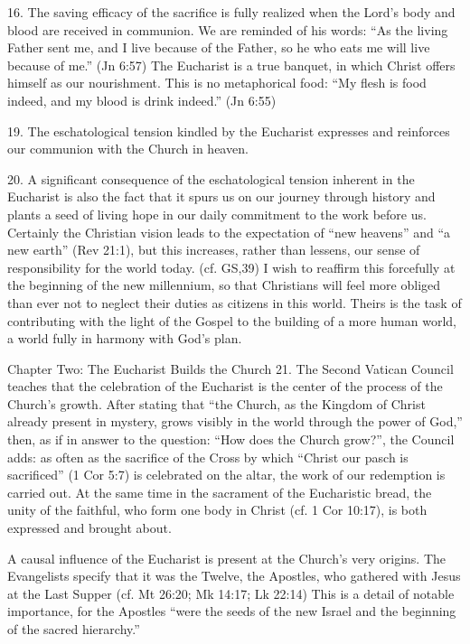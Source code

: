 \documentclass[oneside]{book}
\begin{document}
16. The saving efficacy of the sacrifice is fully realized when the Lord's body
and blood are received in communion. We are reminded of his words: ``As the
living Father sent me, and I live because of the Father, so he who eats me will
live because of me.'' (Jn 6:57) The Eucharist is a true banquet, in which Christ
offers himself as our nourishment. This is no metaphorical food: ``My flesh is
food indeed, and my blood is drink indeed.'' (Jn 6:55)

19. The eschatological tension kindled by the Eucharist expresses and reinforces
our communion with the Church in heaven.

20. A significant consequence of the eschatological tension inherent in the
Eucharist is also the fact that it spurs us on our journey through history and
plants a seed of living hope in our daily commitment to the work before
us. Certainly the Christian vision leads to the expectation of ``new heavens''
and ``a new earth'' (Rev 21:1), but this increases, rather than lessens, our
sense of responsibility for the world today. (cf. GS,39)  I wish to reaffirm
this forcefully at the beginning of the new millennium, so that Christians will
feel more obliged than ever not to neglect their duties as citizens in this
world. Theirs is the task of contributing with the light of the Gospel to the
building of a more human world, a world fully in harmony with God's plan. 

Chapter Two: The Eucharist Builds the Church
21. The Second Vatican Council teaches that the celebration of the Eucharist is
the center of the process of the Church's growth. After stating that ``the
Church, as the Kingdom of Christ already present in mystery, grows visibly in
the world through the power of God,'' then, as if in answer to the question:
``How does the Church grow?'', the Council adds: as often as the sacrifice of
the Cross by which ``Christ our pasch is sacrificed'' (1 Cor 5:7) is celebrated
on the altar, the work of our redemption is carried out. At the same time in the
sacrament of the Eucharistic bread, the unity of the faithful, who form one body
in Christ (cf. 1 Cor 10:17), is both expressed and brought about.

A causal influence of the Eucharist is present at the Church's very origins. The
Evangelists specify that it was the Twelve, the Apostles, who gathered with
Jesus at the Last Supper (cf. Mt 26:20; Mk 14:17; Lk 22:14) This is a detail of
notable importance, for the Apostles ``were the seeds of the new Israel and the
beginning of the sacred hierarchy.''
\end{document}
